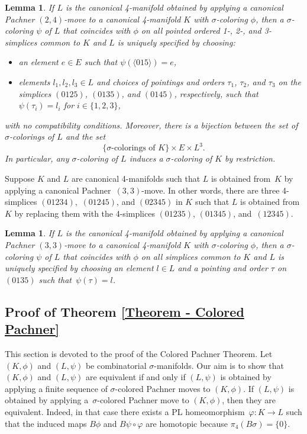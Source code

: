 \documentclass[a4paper, oneside]{amsart}
\numberwithin{equation}{subsection}
\theoremstyle{referencedlemma}
\theoremstyle{plain} %
\newtheorem{lem}[equation]{Lemma}
\theoremstyle{remark}
\begin{document}
\begin{lem}\label{Pachner_(2,4)}
If $L$ is the canonical 4-manifold obtained by applying a canonical Pachner $(2,4)$-move to a canonical 4-manifold $K$ with $\sigma$-coloring $\phi$, then a $\sigma$-coloring $\psi$ of $L$ that coincides with $\phi$ on all pointed ordered 1-, 2-, and 3-simplices common to $K$ and $L$ is uniquely specified by choosing:
\begin{itemize}
\item an element $e\in E$ such that $\psi(\langle 015\rangle) = e$,
\item elements $l_1,l_2,l_3\in L$ and choices of pointings and orders $\tau_1$, $\tau_2$,  and $\tau
_3$ on the simplices $(0125)$, $(0135)$, and $(0145)$, respectively, such that $\psi(\tau_i) = l_i$ for $i\in \{1,2,3\}$,
\end{itemize}
with no compatibility conditions.  Moreover, there is a bijection between the set of $\sigma$-colorings of $L$ and the set 
\[
\{ \text{$\sigma$-colorings of $K$}\}\times E\times L^3.
\]
In particular, any $\sigma$-coloring of $L$ induces a $\sigma$-coloring of $K$ by restriction.
\end{lem}

Suppose $K$ and $L$ are canonical 4-manifolds such that $L$ is obtained from~$K$ by applying a canonical Pachner~$(3,3)$-move.  In other words, there are three 4-simplices $(01234)$,~$(01245)$, and $(02345)$ in $K$ such that $L$ is obtained from $K$ by replacing them with the 4-simplices $(01235)$, $(01345)$, and~$(12345)$. 

\begin{lem}\label{Pachner_(3,3)}
If $L$ is the canonical 4-manifold obtained by applying a canonical Pachner $(3,3)$-move to a canonical 4-manifold $K$ with $\sigma$-coloring $\phi$, then a $\sigma$-coloring $\psi$ of $L$ that coincides with $\phi$ on all simplices common to $K$ and $L$ is uniquely specified by choosing an element $l\in L$ and a pointing and order $\tau$ on $(0135)$ such that~$\psi(\tau) = l$.
\end{lem}

\subsection{Proof of Theorem \ref{Theorem - Colored Pachner}}\label{proof colored Pachner}

This section is devoted to the proof of the Colored Pachner Theorem. Let $(K, \phi)$ and $(L, \psi)$ be combinatorial $\sigma$-manifolds. Our aim is to show that $(K, \phi)$ and $(L, \psi)$ are equivalent if and only if $(L, \psi)$ is obtained by applying a finite sequence of $\sigma$-colored Pachner moves to $(K,\phi)$.  If $(L,\psi)$ is obtained by applying a~$\sigma$-colored Pachner move to $(K, \phi)$, then they are equivalent.  Indeed, in that case there exists a PL homeomorphism~$\varphi\colon K\to L$ such that the induced maps $B\phi$ and $B\psi\circ \varphi$ are homotopic because $\pi_4(B\sigma) = \{0\}$. 
\end{document}
